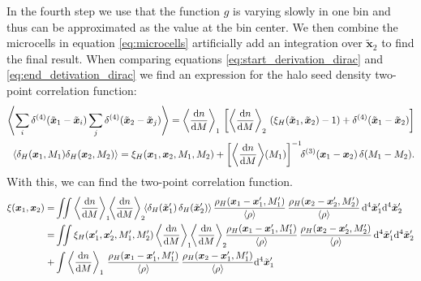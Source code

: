 \documentclass[../main.tex]{subfiles}
\begin{document}
In the fourth step we use that the function $g$ is varying slowly in one bin and thus can be approximated as the value at the bin center. We then combine the microcells in equation \ref{eq:microcells} artificially add an integration over $\tilde{\boldsymbol{x}}_2$ to find the final result. When comparing equations \ref{eq:start_derivation_dirac} and \ref{eq:end_detivation_dirac} we find an expression for the halo seed density two-point correlation function: 
\begin{align}
    \left\langle\sum_i \delta^{(4)}(\tilde{\boldsymbol{x}}_1-\tilde{\boldsymbol{x}}_i)\sum_j \delta^{(4)}(\tilde{\boldsymbol{x}}_2-\tilde{\boldsymbol{x}}_j)\right\rangle = \left\langle \frac{\mathrm{d} n}{\mathrm{d} M} \right\rangle_1\,\left[\left\langle \frac{\mathrm{d} n}{\mathrm{d} M} \right\rangle_2\,( \xi_H(\tilde{\boldsymbol{x}}_1,\tilde{\boldsymbol{x}}_2) -1 )+\delta^{(4)}(\tilde{\boldsymbol{x}}_1-\tilde{\boldsymbol{x}}_2)\right] \\
    \langle \delta_H(\boldsymbol{x}_1,M_1) \delta_H(\boldsymbol{x}_2,M_2) \rangle = \xi_H(\boldsymbol{x}_1,\boldsymbol{x}_2,M_1,M_2)+ \left[\left\langle \frac{\mathrm{d} n}{\mathrm{d} M} \right\rangle\!(M_1) \right]^{-1}\!\! \delta^{(3)}(\boldsymbol{x}_1-\boldsymbol{x}_2)\,\delta(M_1-M_2). \label{eq:two-point-halo-seed-density}
\end{align}
With this, we can find the two-point correlation function.
\begin{align}
    \xi(\boldsymbol{x}_1,\boldsymbol{x}_2) =& \iint \left\langle \frac{\rd n}{\rd M} \right\rangle_1\!\!\left\langle  \frac{\rd n}{\rd M} \right\rangle_2\!\!
    \langle\delta_H(\tilde{\boldsymbol{x}}'_1)\,\delta_H(\tilde{\boldsymbol{x}}'_2)\rangle \,\frac{\rho_H(\boldsymbol{x}_1-\boldsymbol{x}'_1,M_1')}{\langle \rho \rangle} \,\frac{\rho_H(\boldsymbol{x}_2-\boldsymbol{x}'_2,M_2')}{\langle \rho \rangle}\, \rd^4\tilde{\boldsymbol{x}}'_1 \rd^4\tilde{\boldsymbol{x}}'_2 \nonumber\\
    =&\iint \xi_H(\boldsymbol{x}'_1,\boldsymbol{x}'_2,M_1',M_2') \left\langle \frac{\rd n}{\rd M} \right\rangle_1\!\!\left\langle \frac{\rd n}{\rd M} \right\rangle_2 \!\!\frac{\rho_H(\boldsymbol{x}_1-\boldsymbol{x}'_1,M_1')}{\langle \rho \rangle} \,\frac{\rho_H(\boldsymbol{x}_2-\boldsymbol{x}'_2,M_2')}{\langle \rho \rangle}\, \rd^4\tilde{\boldsymbol{x}}'_1 \rd^4\tilde{\boldsymbol{x}}'_2 \nonumber \\
    +&\int \left\langle \frac{\rd n}{\rd M} \right\rangle_1\,\frac{\rho_H(\boldsymbol{x}_1-\boldsymbol{x}'_1,M_1')}{\langle \rho \rangle}\,\frac{\rho_H(\boldsymbol{x}_2-\boldsymbol{x}'_1,M_1')}{\langle \rho \rangle} \rd^4 \tilde{\boldsymbol{x}}_1'
\end{align}
\end{document}
